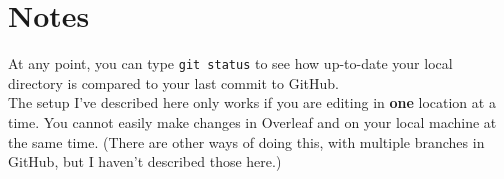 \documentclass[10pt]{article}
\begin{document}
\section{Notes}
At any point, you can type \texttt{git status} to see how up-to-date your local directory is compared to your last commit to GitHub.\\

The setup I've described here only works if you are editing in \textbf{one} location at a time. You cannot easily make changes in Overleaf and on your local machine at the same time. (There are other ways of doing this, with multiple branches in GitHub, but I haven't described those here.)
\end{document}
